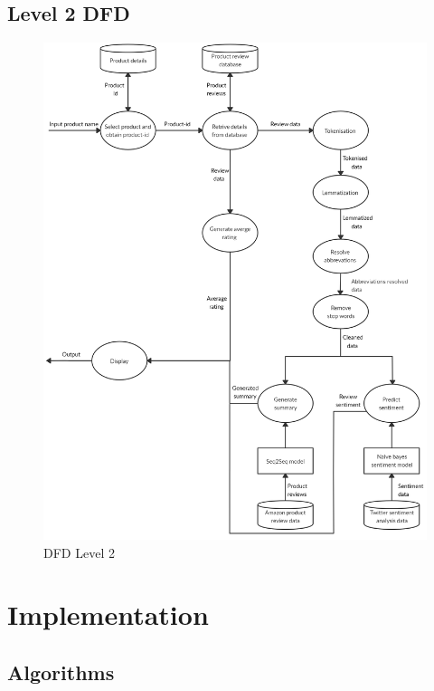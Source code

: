 \documentclass[11pt]{report}
\begin{document}
\section{Level 2 DFD}
\begin{figure}[hbt!]
\centering
\includegraphics[scale=0.3]{images/DFDLevel2.png}
\caption{DFD Level 2}
\label{fig:dfd2}
\end{figure}

\chapter{Implementation}
\section{Algorithms}
\end{document}
